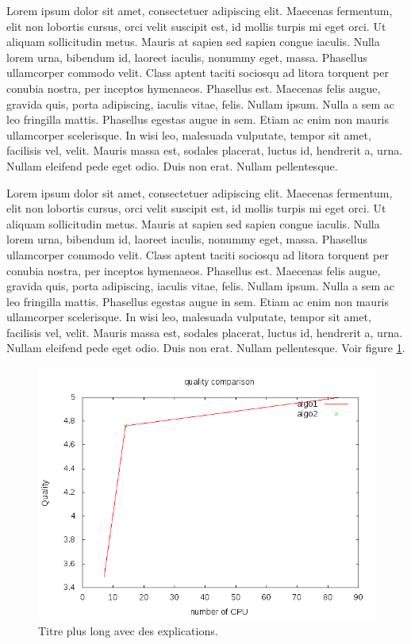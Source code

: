 Lorem ipsum dolor sit amet, consectetuer adipiscing elit. Maecenas fermentum, elit non lobortis cursus, orci velit suscipit est, id mollis turpis mi eget orci. Ut aliquam sollicitudin metus. Mauris at sapien sed sapien congue iaculis. Nulla lorem urna, bibendum id, laoreet iaculis, nonummy eget, massa. Phasellus ullamcorper commodo velit. Class aptent taciti sociosqu ad litora torquent per conubia nostra, per inceptos hymenaeos. Phasellus est. Maecenas felis augue, gravida quis, porta adipiscing, iaculis vitae, felis. Nullam ipsum. Nulla a sem ac leo fringilla mattis. Phasellus egestas augue in sem. Etiam ac enim non mauris ullamcorper scelerisque. In wisi leo, malesuada vulputate, tempor sit amet, facilisis vel, velit. Mauris massa est, sodales placerat, luctus id, hendrerit a, urna. Nullam eleifend pede eget odio. Duis non erat. Nullam pellentesque.

Lorem ipsum dolor sit amet, consectetuer adipiscing elit. Maecenas fermentum, elit non lobortis cursus, orci velit suscipit est, id mollis turpis mi eget orci. Ut aliquam sollicitudin metus. Mauris at sapien sed sapien congue iaculis. Nulla lorem urna, bibendum id, laoreet iaculis, nonummy eget, massa. Phasellus ullamcorper commodo velit. Class aptent taciti sociosqu ad litora torquent per conubia nostra, per inceptos hymenaeos. Phasellus est. Maecenas felis augue, gravida quis, porta adipiscing, iaculis vitae, felis. Nullam ipsum. Nulla a sem ac leo fringilla mattis. Phasellus egestas augue in sem. Etiam ac enim non mauris ullamcorper scelerisque. In wisi leo, malesuada vulputate, tempor sit amet, facilisis vel, velit. Mauris massa est, sodales placerat, luctus id, hendrerit a, urna. Nullam eleifend pede eget odio. Duis non erat. Nullam pellentesque.
Voir figure \ref{fig:mafigure2}.


\begin{figure}[htbp]
   \begin{center}
      \includegraphics[width=0.8\linewidth]{chapter1/figures/comparison.png}
   \end{center}
   \caption[titre court pour la liste des figures]
   {\footnotesize Titre plus long avec des explications.}
   \label{fig:mafigure2}
\end{figure}


